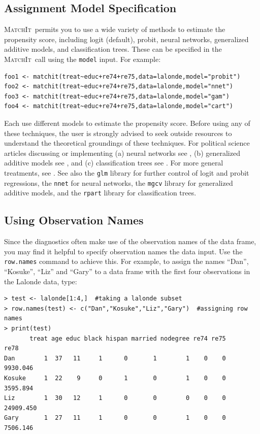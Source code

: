 \documentclass[oneside,letterpaper,titlepage]{article}
\newcommand{\MatchIt}{\textsc{MatchIt}}
\begin{document}
\subsection{Assignment Model Specification}

\MatchIt\ permits you to use a wide variety of methods to
estimate the propensity score, including logit (default), probit,
neural networks, generalized additive models, and classification
trees.  These can be specified in the \MatchIt\ call using the
\texttt{model} input.  For example:

\begin{verbatim}
foo1 <- matchit(treat~educ+re74+re75,data=lalonde,model="probit")
foo2 <- matchit(treat~educ+re74+re75,data=lalonde,model="nnet")
foo3 <- matchit(treat~educ+re74+re75,data=lalonde,model="gam")
foo4 <- matchit(treat~educ+re74+re75,data=lalonde,model="cart")
\end{verbatim}

Each use different models to estimate the propensity score.  Before
using any of these techniques, the user is strongly advised to
seek outside resources to understand the theoretical groundings of
these techniques.  For political science articles discussing or
implementing (a) neural networks see
\citet{beck99,Zeng99,Zeng00,LagRus02}, (b) generalized
additive models see \citet{BecJac98}, and (c) classification trees
see \citet{RugKimMar03}.  For more general treatments,
see \citet{Bishop95,White92,BreFriOls84}. 
See also the \texttt{glm} library for further control of logit and
probit regressions, the \texttt{nnet} for neural networks, the
\texttt{mgcv} library for generalized additive models, and the
\texttt{rpart} library for classification trees.

\subsection{Using Observation Names}
\label{rnames}

Since the diagnostics often make use of the observation names of the
data frame, you may find it helpful to specify observation names the
data input.  Use the \texttt{row.names} command to achieve this.  For
example, to assign the names ``Dan'', ``Kosuke'', ``Liz'' and ``Gary''
to a data frame with the first four observations in the Lalonde data,
type: 

\begin{verbatim}
> test <- lalonde[1:4,]  #taking a lalonde subset
> row.names(test) <- c("Dan","Kosuke","Liz","Gary")  #assigning row names
> print(test)
       treat age educ black hispan married nodegree re74 re75      re78
Dan        1  37   11     1      0       1        1    0    0  9930.046
Kosuke     1  22    9     0      1       0        1    0    0  3595.894
Liz        1  30   12     1      0       0        0    0    0 24909.450
Gary       1  27   11     1      0       0        1    0    0  7506.146
\end{verbatim} 
\end{document}
